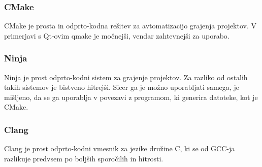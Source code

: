 \documentclass[12pt,titlepage]{report}
\newcommand{\codequote}[1]{\textquote{\texttt{#1}}}
\begin{document}
			\subsubsection{CMake\cite{cmake}}
				CMake je prosta in odprto-kodna rešitev za avtomatizacijo grajenja projektov.
				V primerjavi s Qt-ovim qmake je močnejši, vendar zahtevnejši za uporabo.
			\subsubsection{Ninja\cite{ninja}}
				Ninja je prost odprto-kodni sistem za grajenje projektov.
				Za razliko od ostalih takih sistemov je bistveno hitrejši.
				Sicer ga je možno uporabljati samega, je mišljeno, da se ga uporablja v povezavi z programom, ki generira \codequote{.ninja} datoteke, kot je CMake.
			\subsubsection{Clang\cite{clang}}
				Clang je prost odprto-kodni vmesnik za jezike družine C, ki se od GCC-ja razlikuje predvsem po boljših sporočilih in hitrosti.
\end{document}
